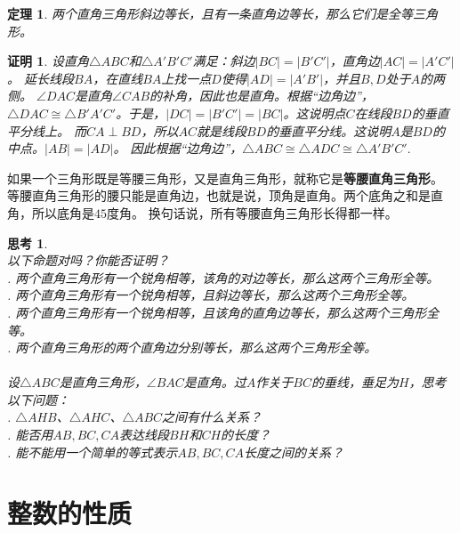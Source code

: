 \documentclass[12pt,UTF8]{ctexbook}
\newtheorem{tm}{定理}[section]
\newtheorem{sk}{思考}[section]
\newtheorem*{proof2}{证明}
\begin{document}
\begin{tm}\label{tm:4-1-1}
    两个直角三角形斜边等长，且有一条直角边等长，那么它们是全等三角形。
\end{tm}
\begin{proof2}
    设直角$\triangle ABC$和$\triangle A'B'C'$满足：斜边$|BC| = |B'C'|$，直角边$|AC| = |A'C'|$。
    延长线段$BA$，在直线$BA$上找一点$D$使得$|AD| = |A'B'|$，并且$B,D$处于$A$的两侧。
    $\angle DAC$是直角$\angle CAB$的补角，因此也是直角。根据“边角边”，
    $\triangle DAC \cong \triangle B'A'C'$。于是，$|DC| = |B'C'| = |BC|$。这说明点$C$在线段$BD$的垂直平分线上。
    而$CA \perp BD$，所以$AC$就是线段$BD$的垂直平分线。这说明$A$是$BD$的中点。$|AB| = |AD|$。
    因此根据“边角边”，$\triangle ABC \cong \triangle ADC \cong \triangle A'B'C'.$
\end{proof2}

如果一个三角形既是等腰三角形，又是直角三角形，就称它是\textbf{等腰直角三角形}。
等腰直角三角形的腰只能是直角边，也就是说，顶角是直角。两个底角之和是直角，所以底角是$45$度角。
换句话说，所有等腰直角三角形长得都一样。

\begin{sk}\label{sk:4-1-0}
    \mbox{}\\
    以下命题对吗？你能否证明？\\
    . 两个直角三角形有一个锐角相等，该角的对边等长，那么这两个三角形全等。\\
    . 两个直角三角形有一个锐角相等，且斜边等长，那么这两个三角形全等。\\
    . 两个直角三角形有一个锐角相等，且该角的直角边等长，那么这两个三角形全等。\\
    . 两个直角三角形的两个直角边分别等长，那么这两个三角形全等。\\
    \vspace{2pt}\\
    设$\triangle ABC$是直角三角形，$\angle BAC$是直角。过$A$作关于$BC$的垂线，垂足为$H$，思考以下问题：\\
    . $\triangle AHB$、$\triangle AHC$、$\triangle ABC$之间有什么关系？\\
    . 能否用$AB, BC, CA$表达线段$BH$和$CH$的长度？\\
    . 能不能用一个简单的等式表示$AB, BC, CA$长度之间的关系？
\end{sk}


\chapter{整数的性质}
\end{document}
